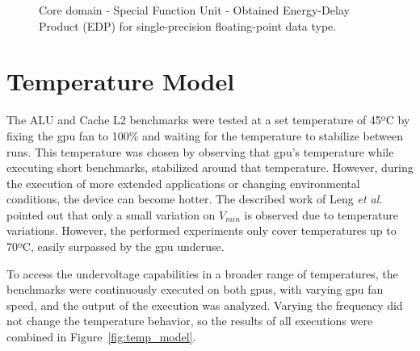 \begin{figure}[!htb]
    \centering
    \begin{subfigmatrix}{2}
      \label{fig:SFU_EDP}
    \end{subfigmatrix}
    \caption{Core domain - Special Function Unit - Obtained Energy-Delay Product (EDP) for single-precision floating-point data type.}
\end{figure}

\section{Temperature Model}
\label{sec:temp_model}

The ALU and Cache L2 benchmarks were tested at a set temperature of 45ºC by fixing the \acrshort{gpu} fan to 100\% and waiting for the temperature to stabilize between runs. This temperature was chosen by observing that \acrshort{gpu}'s temperature while executing short benchmarks, stabilized around that temperature. However, during the execution of more extended applications or changing environmental conditions, the device can become hotter. The described work of Leng \textit{et al.}~\cite{leng_safe_2015} pointed out that only a small variation on $V_{min}$ is observed due to temperature variations. However, the performed experiments only cover temperatures up to 70ºC, easily surpassed by the \acrshort{gpu} underuse. 

To access the undervoltage capabilities in a broader range of temperatures, the benchmarks were continuously executed on both \acrshort{gpu}s, with varying \acrshort{gpu} fan speed, and the output of the execution was analyzed. Varying the frequency did not change the temperature behavior, so the results of all executions were combined in Figure~\ref{fig:temp_model}. 

